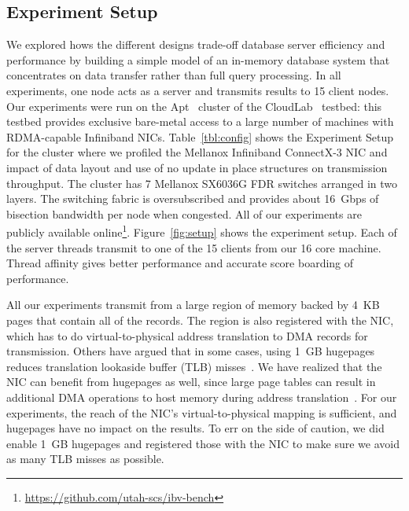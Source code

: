 \subsection{Experiment Setup}
We explored hows the different designs trade-off database server efficiency and
performance by building a simple model of an in-memory database system that
concentrates on data transfer rather than full query processing. In all experiments,
one node acts as a server and transmits results to 15 client nodes.
Our experiments were run on the Apt~\cite{Ricci+:OSR15} cluster of the
CloudLab~\cite{Cloudlab:URL} testbed: this testbed provides exclusive bare-metal
access to a large number of machines with RDMA-capable Infiniband NICs.
Table~\ref{tbl:config} shows the Experiment Setup for the cluster where we profiled
the Mellanox Infiniband ConnectX-3 \textregistered NIC and impact of data layout and 
use of no update in place structures on transmission throughput. The cluster has 7
Mellanox SX6036G FDR switches arranged in two layers. The switching fabric is
oversubscribed and provides about 16~Gbps of bisection bandwidth per node
when congested. All of our experiments are publicly available online\footnote{\url{https://github.com/utah-scs/ibv-bench}}.
Figure~\ref{fig:setup} shows the experiment setup. Each of the server threads transmit to one of the 15 clients from our 16 core machine. 
Thread affinity gives better performance and accurate score boarding of performance.


All our experiments transmit from a large region of memory backed by 4~KB pages
that contain all of the records. The region is also
registered with the NIC, which has to do virtual-to-physical address
translation to DMA records for transmission.
Others have argued that in some cases, using 1~GB hugepages reduces translation lookaside buffer
(TLB) misses~\cite{infinibandhugepages}. We have realized that the NIC can benefit from
hugepages as well, since large page tables can result in additional
DMA operations to host memory during address translation~\cite{farm,rdma}. For
our experiments, the reach of the NIC's virtual-to-physical mapping is
sufficient, and hugepages have no impact on the results. To err on the side of caution, 
we did enable 1~GB hugepages and registered those with the NIC to make sure we 
avoid as many TLB misses as possible.
\newpage



